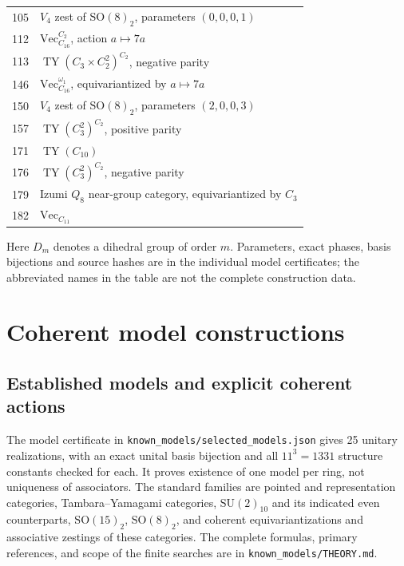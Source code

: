 \documentclass[11pt,a4paper]{article}
\begin{document}
\begin{longtable}{r p{}}
105 & $V_4$ zest of $\mathrm{SO}(8)_2$, parameters $(0,0,0,1)$\\[3pt]

112 & $\mathrm{Vec}_{C_{16}}^{C_2}$, action $a\mapsto7a$\\[3pt]

113 & $\operatorname{TY}(C_3\times C_2^2)^{C_2}$, negative parity\\[3pt]

146 & $\mathrm{Vec}_{C_{16}}^{\omega_1}$, equivariantized by $a\mapsto7a$\\[3pt]

150 & $V_4$ zest of $\mathrm{SO}(8)_2$, parameters $(2,0,0,3)$\\[3pt]

157 & $\operatorname{TY}(C_3^2)^{C_2}$, positive parity\\[3pt]

171 & $\operatorname{TY}(C_{10})$\\[3pt]

176 & $\operatorname{TY}(C_3^2)^{C_2}$, negative parity\\[3pt]

179 & Izumi $Q_8$ near-group category, equivariantized by $C_3$\\[3pt]

182 & $\mathrm{Vec}_{C_{11}}$\\[3pt]

\bottomrule\end{longtable}\normalsize
Here $D_m$ denotes a dihedral group of order $m$. Parameters, exact phases,
basis bijections and source hashes are in the individual model certificates;
the abbreviated names in the table are not the complete construction data.
\clearpage\section{Coherent model constructions}

\subsection{Established models and explicit coherent actions}
The model certificate in \texttt{known\_models/selected\_models.json} gives
25 unitary realizations, with an exact unital basis bijection and all
$11^3=1331$ structure constants checked for each.  It proves existence of
one model per ring, not uniqueness of associators.  The standard families
are pointed and representation categories, Tambara--Yamagami categories,
$\mathrm{SU}(2)_{10}$ and its indicated even counterparts,
$\mathrm{SO}(15)_2$, $\mathrm{SO}(8)_2$, and coherent equivariantizations
and associative zestings of these categories.  The complete formulas,
primary references, and scope of the finite searches are in
\texttt{known\_models/THEORY.md}.
\end{document}
